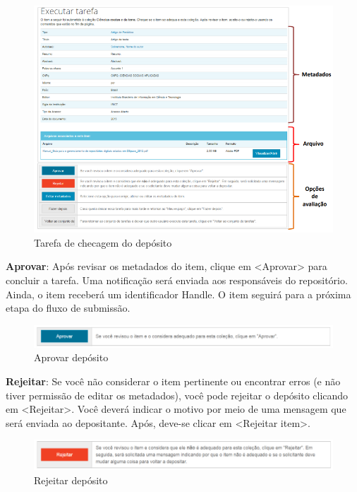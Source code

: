 \documentclass[12pt,hidelinks]{article}
\begin{document}
    \begin{figure}[!htp]
                \centering
                \includegraphics[scale=0.7]{figura/Figura172.png}
                \caption{Tarefa de checagem do depósito}
            \label{Rotulo}
        \end{figure}
    
    \textbf{Aprovar}: Após revisar os metadados do item, clique em <Aprovar> para concluir a tarefa. Uma notificação será enviada aos responsáveis do repositório. Ainda, o item receberá um identificador Handle. O item seguirá para a próxima etapa do fluxo de submissão.
    
    \begin{figure}[!htp]
                \centering
                \includegraphics[scale=0.7]{figura/Figura173.png}
                \caption{Aprovar depósito}
            \label{Rotulo}
        \end{figure}
    
    \textbf{Rejeitar}: Se você não considerar o item pertinente ou encontrar erros (e não tiver permissão de editar os metadados), você pode rejeitar o depósito clicando em <Rejeitar>. Você deverá indicar o motivo por meio de uma mensagem que será enviada ao depositante. Após, deve-se clicar em <Rejeitar item>.
    
    \begin{figure}[!htp]
                \centering
                \includegraphics[scale=0.7]{figura/Figura174.png}
                \caption{Rejeitar depósito}
            \label{Rotulo}
        \end{figure}
    
\end{document}
